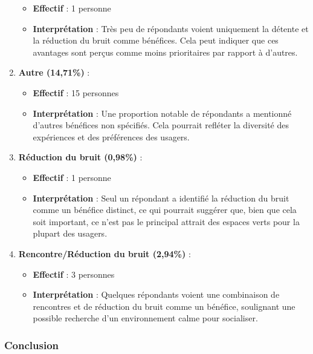 \documentclass[
]{article}
\providecommand{\tightlist}{%
  \setlength{\itemsep}{0pt}\setlength{\parskip}{0pt}}
\begin{document}
\begin{enumerate}
  \begin{itemize}
  \tightlist
  \item
    \textbf{Effectif} : 1 personne
  \item
    \textbf{Interprétation} : Très peu de répondants voient uniquement
    la détente et la réduction du bruit comme bénéfices. Cela peut
    indiquer que ces avantages sont perçus comme moins prioritaires par
    rapport à d'autres.
  \end{itemize}
\item
  \textbf{Autre (14,71\%)} :

  \begin{itemize}
  \tightlist
  \item
    \textbf{Effectif} : 15 personnes
  \item
    \textbf{Interprétation} : Une proportion notable de répondants a
    mentionné d'autres bénéfices non spécifiés. Cela pourrait refléter
    la diversité des expériences et des préférences des usagers.
  \end{itemize}
\item
  \textbf{Réduction du bruit (0,98\%)} :

  \begin{itemize}
  \tightlist
  \item
    \textbf{Effectif} : 1 personne
  \item
    \textbf{Interprétation} : Seul un répondant a identifié la réduction
    du bruit comme un bénéfice distinct, ce qui pourrait suggérer que,
    bien que cela soit important, ce n'est pas le principal attrait des
    espaces verts pour la plupart des usagers.
  \end{itemize}
\item
  \textbf{Rencontre/Réduction du bruit (2,94\%)} :

  \begin{itemize}
  \tightlist
  \item
    \textbf{Effectif} : 3 personnes
  \item
    \textbf{Interprétation} : Quelques répondants voient une combinaison
    de rencontres et de réduction du bruit comme un bénéfice, soulignant
    une possible recherche d'un environnement calme pour socialiser.
  \end{itemize}
\end{enumerate}

\subsubsection{Conclusion}\label{conclusion-4}
\end{document}
